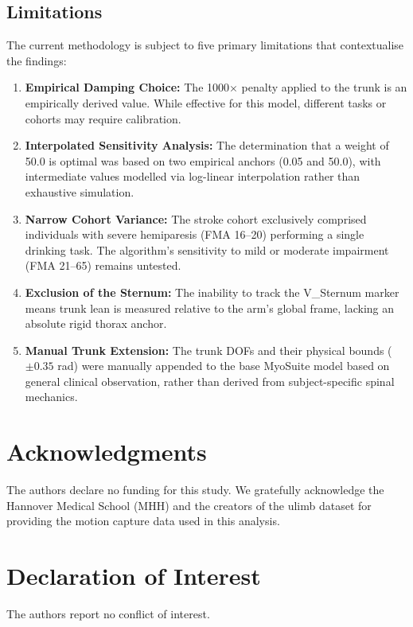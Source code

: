 \documentclass[12pt, a4paper]{article}
\begin{document}
\subsection{Limitations}
The current methodology is subject to five primary limitations that contextualise the findings:
\begin{enumerate}
    \item \textbf{Empirical Damping Choice:} The 1000$\times$ penalty applied to the trunk is an empirically derived value. While effective for this model, different tasks or cohorts may require calibration. 
    \item \textbf{Interpolated Sensitivity Analysis:} The determination that a weight of 50.0 is optimal was based on two empirical anchors (0.05 and 50.0), with intermediate values modelled via log-linear interpolation rather than exhaustive simulation.
    \item \textbf{Narrow Cohort Variance:} The stroke cohort exclusively comprised individuals with severe hemiparesis (FMA 16–20) performing a single drinking task. The algorithm's sensitivity to mild or moderate impairment (FMA 21–65) remains untested. 
    \item \textbf{Exclusion of the Sternum:} The inability to track the V\_Sternum marker means trunk lean is measured relative to the arm's global frame, lacking an absolute rigid thorax anchor. 
    \item \textbf{Manual Trunk Extension:} The trunk DOFs and their physical bounds ($\pm0.35$ rad) were manually appended to the base MyoSuite model based on general clinical observation, rather than derived from subject-specific spinal mechanics. 
\end{enumerate}

\section*{Acknowledgments}
The authors declare no funding for this study. We gratefully acknowledge the Hannover Medical School (MHH) and the creators of the ulimb dataset for providing the motion capture data used in this analysis.

\section*{Declaration of Interest}
The authors report no conflict of interest.

\clearpage


\end{document}
